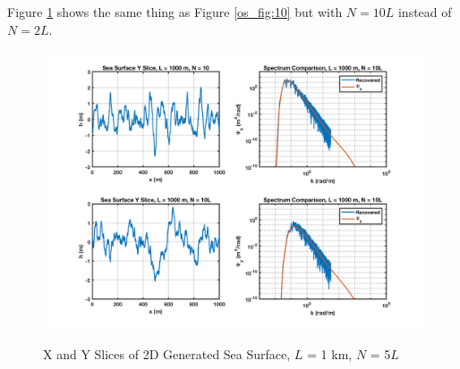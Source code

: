 Figure \ref{os_fig:10a} shows the same thing as Figure \ref{os_fig:10} but with $N=10L$ instead of $N = 2L$.
\begin{figure}[H]
  \begin{center}
\includegraphics[width=6in]{../media/Ocean_Surface/sea_surface_2d_slices_1000_10.png}
  \end{center}
  \renewcommand{\baselinestretch}{1} \small\normalsize
  \begin{quote}
    \caption[X and Y Slices of 2D Generated Sea Surface, $L$ = 1 km, $N$ = 5$L$]{X and Y Slices of 2D Generated Sea Surface, $L$ = 1 km, $N$ = 5$L$\label{os_fig:10a}}
  \end{quote}
\end{figure}
\renewcommand{\baselinestretch}{2} \small\normalsize

